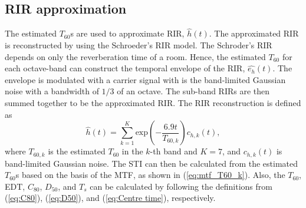 \documentclass[conference]{IEEEtran}
\begin{document}
	\subsection{RIR approximation}
	The estimated $T_{60}$s are used to approximate RIR, $\hat{h}(t)$. The approximated RIR is reconstructed by using the Schroeder's RIR model. The Schroder's RIR depends on only the reverberation time of a room. Hence, the estimated $T_{60}$ for each octave-band can construct the temporal envelope of the RIR, $\hat{e_h}(t)$. The envelope is modulated with a carrier signal with is the band-limited Gaussian noise with a bandwidth of $1/3$ of an octave. The sub-band RIRs are then summed together to be the approximated RIR. The RIR reconstruction is defined as 
	\begin{equation}
		\hat{h}(t)\!=\!\sum_{k=1}^{K} \text{exp} \left( -\frac{6.9t}{{T_{60,k}}} \right) c_{h,k}(t),
		\label{eq:ReconRIR}
	\end{equation}
	where ${T_{60,k}}$ is the estimated $T_{60}$ in the $k$-th band and $K=7$, and $c_{h,k}(t)$ is band-limited Gaussian noise. The STI can then be calculated from the estimated $T_{60}$s based on the basis of the MTF, as shown in (\ref{eq:mtf_T60_k}). Also, the $T_{60}$, EDT, $C_{80}$, $D_{50}$, and $T_s$ can be calculated by following the definitions from (\ref{eq:C80}), (\ref{eq:D50}), and (\ref{eq:Centre time}), respectively.
	
\end{document}
